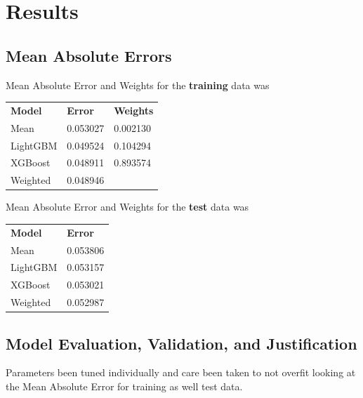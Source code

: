 \documentclass[a4paper]{article}
\begin{document}
\section{Results}

\subsection{Mean Absolute Errors}
Mean Absolute Error and Weights for the \textbf{training} data was
\begin{center}
\begin{tabular}{ l l l }
    \textbf{Model} & \textbf{Error} & \textbf{Weights} \\
    Mean & 0.053027 & 0.002130 \\
    LightGBM & 0.049524 & 0.104294 \\
    XGBoost  & 0.048911 & 0.893574 \\
    Weighted & 0.048946 & \\
\end{tabular}
\end{center}

Mean Absolute Error and Weights for the \textbf{test} data was
\begin{center}
\begin{tabular}{ l l }
    \textbf{Model} & \textbf{Error} \\
    Mean & 0.053806  \\
    LightGBM & 0.053157  \\
    XGBoost  & 0.053021  \\
    Weighted & 0.052987  \\
\end{tabular}
\end{center}


\subsection{Model Evaluation, Validation, and Justification}


Parameters been tuned individually and care been taken to not overfit looking at the Mean Absolute Error for training as well test data.
\end{document}
